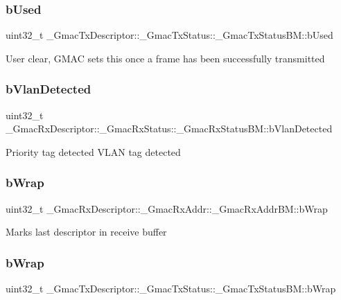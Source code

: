\subsubsection{\texorpdfstring{bUsed}{bUsed}}
{\footnotesize\ttfamily uint32\+\_\+t \+\_\+\+Gmac\+Tx\+Descriptor\+::\+\_\+\+Gmac\+Tx\+Status\+::\+\_\+\+Gmac\+Tx\+Status\+B\+M\+::b\+Used}

User clear, G\+M\+AC sets this once a frame has been successfully transmitted \mbox{\label{group__gmac__defines_ga8caa121d2ce4282773dfb84e332afbf1}} 
\subsubsection{\texorpdfstring{bVlanDetected}{bVlanDetected}}
{\footnotesize\ttfamily uint32\+\_\+t \+\_\+\+Gmac\+Rx\+Descriptor\+::\+\_\+\+Gmac\+Rx\+Status\+::\+\_\+\+Gmac\+Rx\+Status\+B\+M\+::b\+Vlan\+Detected}

Priority tag detected V\+L\+AN tag detected \mbox{\label{group__gmac__defines_gae5d7e7953d3959acddd6b70f99b4ddc9}} 
\subsubsection{\texorpdfstring{bWrap}{bWrap}\hspace{0.1cm}{\footnotesize\ttfamily [1/2]}}
{\footnotesize\ttfamily uint32\+\_\+t \+\_\+\+Gmac\+Rx\+Descriptor\+::\+\_\+\+Gmac\+Rx\+Addr\+::\+\_\+\+Gmac\+Rx\+Addr\+B\+M\+::b\+Wrap}

Marks last descriptor in receive buffer \mbox{\label{group__gmac__defines_ga9f84a7eadddc254a2b72d64891fb5cc6}} 
\subsubsection{\texorpdfstring{bWrap}{bWrap}\hspace{0.1cm}{\footnotesize\ttfamily [2/2]}}
{\footnotesize\ttfamily uint32\+\_\+t \+\_\+\+Gmac\+Tx\+Descriptor\+::\+\_\+\+Gmac\+Tx\+Status\+::\+\_\+\+Gmac\+Tx\+Status\+B\+M\+::b\+Wrap}

